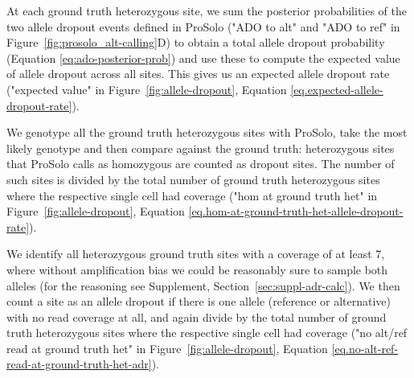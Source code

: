 \documentclass[fleqn,12pt,inline]{wlscirep}
\begin{document}
\begin{enumerate*}
 \item At each ground truth heterozygous site, we sum the posterior probabilities of the two allele dropout events defined in ProSolo ("ADO to alt" and "ADO to ref" in Figure~\ref{fig:prosolo_alt-calling}D) to obtain a total allele dropout probability (Equation \ref{eq:ado-posterior-prob}) and use these to compute the expected value of allele dropout across all sites.
 This gives us an expected allele dropout rate ("expected value" in Figure~\ref{fig:allele-dropout}, Equation \ref{eq.expected-allele-dropout-rate}).
 \item We genotype all the ground truth heterozygous sites with ProSolo, take the most likely genotype and then compare against the ground truth: heterozygous sites that ProSolo calls as homozygous are counted as dropout sites. The number of such sites is divided by the total number of ground truth heterozygous sites where the respective single cell had coverage ("hom at ground truth het" in Figure~\ref{fig:allele-dropout}, Equation \ref{eq.hom-at-ground-truth-het-allele-dropout-rate}).
 \item We identify all heterozygous ground truth sites with a coverage of at least 7, where without amplification bias we could be reasonably sure to sample both alleles (for the reasoning see Supplement, Section~\ref{sec:suppl-adr-calc}).
 We then count a site as an allele dropout if there is one allele (reference or alternative) with no read coverage at all, and again divide by the total number of ground truth heterozygous sites where the respective single cell had coverage ("no alt/ref read at ground truth het" in Figure~\ref{fig:allele-dropout}, Equation \ref{eq.no-alt-ref-read-at-ground-truth-het-adr}).
\end{enumerate*}
\end{document}
